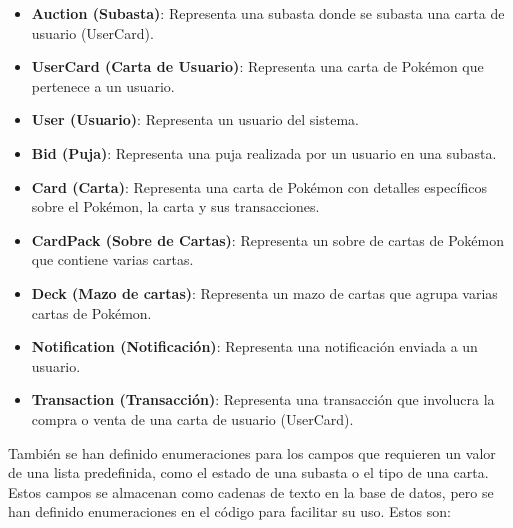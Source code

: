 \begin{itemize}

    \item \textbf{Auction (Subasta)}: Representa una subasta donde se subasta una carta de usuario (UserCard).

    \item \textbf{UserCard (Carta de Usuario)}: Representa una carta de Pokémon que pertenece a un usuario.

    \item \textbf{User (Usuario)}: Representa un usuario del sistema.

    \item \textbf{Bid (Puja)}: Representa una puja realizada por un usuario en una subasta.

    \item \textbf{Card (Carta)}: Representa una carta de Pokémon con detalles específicos sobre el Pokémon, la carta y sus transacciones.

    \item \textbf{CardPack (Sobre de Cartas)}: Representa un sobre de cartas de Pokémon que contiene varias cartas.

    \item \textbf{Deck (Mazo de cartas)}: Representa un mazo de cartas que agrupa varias cartas de Pokémon.

    \item \textbf{Notification (Notificación)}: Representa una notificación enviada a un usuario.

    \item \textbf{Transaction (Transacción)}: Representa una transacción que involucra la compra o venta de una carta de usuario (UserCard).

\end{itemize}

También se han definido enumeraciones para los campos que requieren un valor de una lista predefinida, como el estado de una subasta o el tipo de una carta.
Estos campos se almacenan como cadenas de texto en la base de datos, pero se han definido enumeraciones en el código para facilitar su uso. Estos son:

